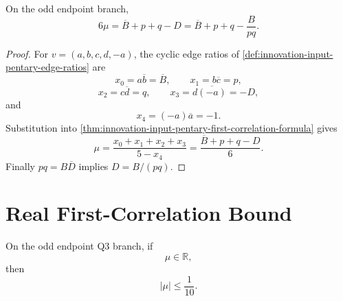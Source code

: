 \begin{theorem}
\label{thm:innovation-input-odd-endpoint-first-correlation}
On the odd endpoint branch,
$$
6\mu
=
\overline B+p+q-D
=
\overline B+p+q-\frac{B}{pq}.
$$
\end{theorem}

\begin{proof}
For $v=(a,b,c,d,-a)$, the cyclic edge ratios of
\autoref{def:innovation-input-pentary-edge-ratios} are
$$
x_0=a\overline b=\overline B,
\qquad
x_1=b\overline c=p,
$$
$$
x_2=c\overline d=q,
\qquad
x_3=d\overline{(-a)}=-D,
$$
and
$$
x_4=(-a)\overline a=-1.
$$
Substitution into
\autoref{thm:innovation-input-pentary-first-correlation-formula} gives
$$
\mu
=
\frac{x_0+x_1+x_2+x_3}{5-x_4}
=
\frac{\overline B+p+q-D}{6}.
$$
Finally $pq=B\overline D$ implies $D=B/(pq)$.
\end{proof}

\section{Real First-Correlation Bound}
\label{sec:innovation-input-odd-endpoint-real-first-correlation-bound}

\begin{lemma}
\label{lem:innovation-input-odd-endpoint-real-mean-bound}
On the odd endpoint Q3 branch, if
$$
\mu\in\mathbb R,
$$
then
$$
|\mu|\le\frac1{10}.
$$
\end{lemma}

